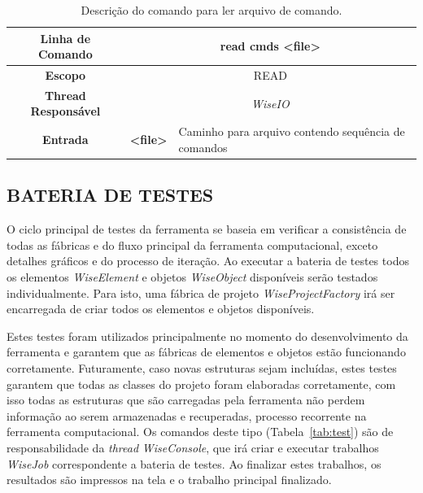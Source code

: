 \begin{center}
	\begin{table}[!htbp]
		\begin{tabularx}{\textwidth}{c|c|X}
			\toprule
			\textbf{Linha de Comando} & \multicolumn{2}{c}{read cmds <file>} \\
			\midrule
			\textbf{Escopo} & \multicolumn{2}{c}{READ} \\
			\hline
			\textbf{Thread Responsável} & \multicolumn{2}{c}{\textit{WiseIO}} \\
			\hline
			\textbf{Entrada} & \textbf{<file>} & Caminho para arquivo contendo sequência de comandos \\
			\bottomrule
		\end{tabularx}
		\caption{Descrição do comando para ler arquivo de comando.}
		\label{tab:read}
	\end{table}
\end{center}

\subsection{BATERIA DE TESTES}\label{sec:test}

O ciclo principal de testes da ferramenta se baseia em verificar a consistência de todas as fábricas e do fluxo principal da ferramenta computacional, exceto detalhes gráficos e do processo de iteração. Ao executar a bateria de testes todos os elementos \textit{WiseElement} e objetos \textit{WiseObject} disponíveis serão testados individualmente. Para isto, uma fábrica de projeto \textit{WiseProjectFactory} irá ser encarregada de criar todos os elementos e objetos disponíveis.

Estes testes foram utilizados principalmente no momento do desenvolvimento da ferramenta e garantem que as fábricas de elementos e objetos estão funcionando corretamente. Futuramente, caso novas estruturas sejam incluídas, estes testes garantem que todas as classes do projeto foram elaboradas corretamente, com isso todas as estruturas que são carregadas pela ferramenta não perdem informação ao serem armazenadas e recuperadas, processo recorrente na ferramenta computacional. Os comandos deste tipo (Tabela~\ref{tab:test}) são de responsabilidade da \textit{thread} \textit{WiseConsole}, que irá criar e executar trabalhos \textit{WiseJob} correspondente a bateria de testes. Ao finalizar estes trabalhos, os resultados são impressos na tela e o trabalho principal finalizado.


